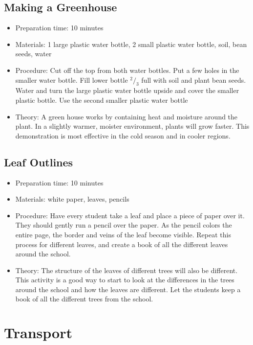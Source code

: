 \subsection{Making a Greenhouse}
\begin{itemize}
\item{Preparation time: 10 minutes}
\item{Materials: 1 large plastic water bottle, 2 small plastic water bottle, soil, bean seeds, water}
\item{Procedure: Cut off the top from both water bottles. Put a few holes in the smaller water bottle. Fill lower bottle $^2/_3$ full with soil and plant bean seeds. Water and turn the large plastic water bottle upside and cover the smaller plastic bottle. Use the second smaller plastic water bottle}%
\item{Theory: A green house works by containing heat and moisture around the plant. In a slightly warmer, moister environment, plants will grow faster. This demonstration is most effective in the cold season and in cooler regions.}
\end{itemize}

\subsection{Leaf Outlines}
\begin{itemize}
\item{Preparation time: 10 minutes}
\item{Materials: white paper, leaves, pencils}
\item{Procedure: Have every student take a leaf and place a piece of paper over it. They should gently run a pencil over the paper. As the pencil colors the entire page, the border and veins of the leaf become visible. Repeat this process for different leaves, and create a book of all the different leaves around the school.}
\item{Theory: The structure of the leaves of different trees will also be different. This activity is a good way to start to look at the differences in the trees around the school and how the leaves are different. Let the students keep a book of all the different trees from the school.}
\end{itemize}

\section{Transport}

